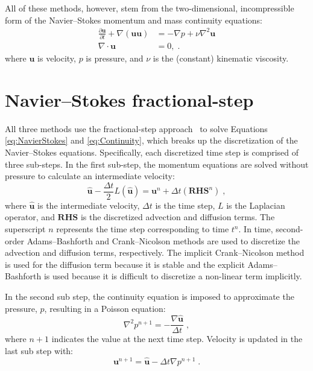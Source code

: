 All of these methods, however, stem from the two-dimensional, incompressible form of the Navier--Stokes momentum and mass continuity equations:
\begin{align}
\frac{\partial \textbf{u}}{\partial t} + \nabla ( \textbf{uu} ) &= -\nabla p + \nu\nabla^{2}\textbf{u} \label{eq:NavierStokes} \\
\nabla \cdot \textbf{u} &= 0, \label{eq:Continuity} \;.
\end{align}
where $\textbf{u}$ is velocity, $p$ is pressure, and $\nu$ is the (constant) kinematic viscosity.

\section{Navier--Stokes fractional-step}\label{NM:NavierStokes}
All three methods use the fractional-step approach~\cite{Perot1993} to solve Equations \eqref{eq:NavierStokes} and \eqref{eq:Continuity}, which breaks up the discretization of the Navier--Stokes equations. 
Specifically, each discretized time step is comprised of three sub-steps.
In the first sub-step, the momentum equations are solved without pressure to  calculate an intermediate velocity:
\begin{equation}\label{eq:Intermediate Velocity}
\hat{\textbf{u}} - \frac{\Delta t}{2}L(\hat{\textbf{u}}) = \textbf{u}^n + \Delta t(\textbf{RHS}^n) \;,
\end{equation}
where $\hat{\textbf{u}}$ is the intermediate velocity, $\Delta t$ is the time step, $L$ is the Laplacian operator, and $\textbf{RHS}$ is the discretized advection and diffusion terms. 
The superscript $n$ represents the time step corresponding to time $t^n$. 
In time, second-order Adams--Bashforth and Crank--Nicolson methods are used to discretize the advection and diffusion terms, respectively. 
The implicit Crank--Nicolson method is used for the diffusion term because it is stable and the explicit Adams--Bashforth is used because it is difficult to discretize a non-linear term implicitly. 

In the second sub step, the continuity equation is imposed to approximate the pressure, $p$, resulting in a Poisson equation:
\begin{equation}\label{eq:Poisson}
\nabla^2p^{n+1} = - \frac{\nabla\hat{\textbf{u}}}{\Delta t} \;,
\end{equation}
\newline where $n+1$ indicates the value at the next time step. Velocity is updated in the last sub step with:
\begin{equation}\label{eq:Projection}
\textbf{u}^{n+1} = \hat{\textbf{u}} - \Delta t\nabla p^{n+1} \;.
\end{equation}

